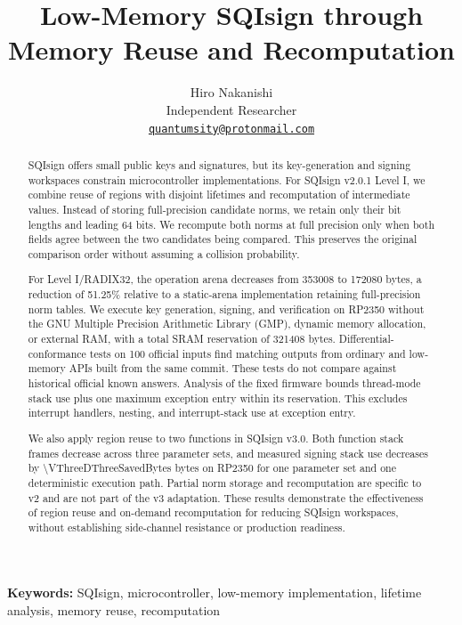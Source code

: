 \documentclass[a4paper,10pt]{article}
\title{Low-Memory SQIsign through Memory Reuse and Recomputation}
\author{%
  Hiro Nakanishi\\[-0.2ex]
  {\small Independent Researcher}\\[-0.2ex]
  {\small\href{mailto:quantumsity@protonmail.com}{\texttt{quantumsity@protonmail.com}}}}
\date{}
\theoremstyle{definition}
\theoremstyle{remark}
\begin{document}
\maketitle

\begin{abstract}
SQIsign offers small public keys and signatures, but its key-generation and signing workspaces constrain microcontroller implementations. For SQIsign v2.0.1 Level I, we combine reuse of regions with disjoint lifetimes and recomputation of intermediate values. Instead of storing full-precision candidate norms, we retain only their bit lengths and leading 64 bits. We recompute both norms at full precision only when both fields agree between the two candidates being compared. This preserves the original comparison order without assuming a collision probability.

For Level I/RADIX32, the operation arena decreases from \num{353008} to \num{172080} bytes, a reduction of \num{51.25}\% relative to a static-arena implementation retaining full-precision norm tables. We execute key generation, signing, and verification on RP2350 without the GNU Multiple Precision Arithmetic Library (GMP), dynamic memory allocation, or external RAM, with a total SRAM reservation of \num{321408} bytes. Differential-conformance tests on 100 official inputs find matching outputs from ordinary and low-memory APIs built from the same commit. These tests do not compare against historical official known answers. Analysis of the fixed firmware bounds thread-mode stack use plus one maximum exception entry within its reservation. This excludes interrupt handlers, nesting, and interrupt-stack use at exception entry.

We also apply region reuse to two functions in SQIsign v3.0. Both function stack frames decrease across three parameter sets, and measured signing stack use decreases by \num{\VThreeDThreeSavedBytes} bytes on RP2350 for one parameter set and one deterministic execution path. Partial norm storage and recomputation are specific to v2 and are not part of the v3 adaptation. These results demonstrate the effectiveness of region reuse and on-demand recomputation for reducing SQIsign workspaces, without establishing side-channel resistance or production readiness.
\end{abstract}

\begin{center}
\small
\textbf{Keywords:}
SQIsign, microcontroller, low-memory implementation, lifetime analysis, memory reuse, recomputation
\end{center}
\end{document}
